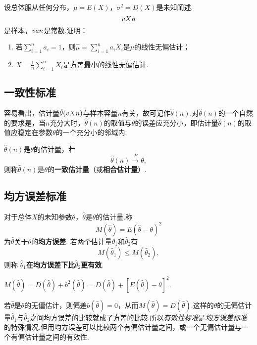 \begin{example}
设总体服从任何分布，\(\mu=E(X)\)，\(\sigma^2=D(X)\)是未知阐述.\[
v{X}{n}
\]是样本，\(v{a}{n}\)是常数.证明：
\begin{enumerate}
\item 若\(\sum\limits_{i=1}^n{a_i}=1\)，则\(\hat{\mu}=\sum\limits_{i=1}^n{a_i X_i}\)是\(\mu\)的线性无偏估计；
\item \(\overline{X} = \frac{1}{n} \sum\limits_{i=1}^n{X_i}\)是方差最小的线性无偏估计.
\end{enumerate}
\end{example}

\subsection{一致性标准}
容易看出，估计量\(\hat{\theta}(v{X}{n})\)与样本容量\(n\)有关，故可记作\(\hat{\theta}(n)\).对\(\hat{\theta}(n)\)的一个自然的要求是，当\(n\)充分大时，\(\hat{\theta}(n)\)的取值与\(\theta\)的误差应充分小，即估计量\(\hat{\theta}(n)\)的取值应稳定在参数\(\theta\)的一个充分小的邻域内.
\begin{definition}
\(\hat{\theta}(n)\)是\(\theta\)的估计量，若\[
\hat{\theta}(n) \overset{P}{\longrightarrow} \theta,
\]则称\(\hat{\theta}(n)\)是\(\theta\)的\textbf{一致估计量}（或\textbf{相合估计量}）.
\end{definition}

\subsection{均方误差标准}
\begin{definition}
对于总体\(X\)的未知参数\(\theta\)，\(\hat{\theta}\)是\(\theta\)的估计量.称\[
M(\hat{\theta}) = E(\hat{\theta} - \theta)^2
\]为\(\hat{\theta}\)关于\(\theta\)的\textbf{均方误差}.
若两个估计量\(\hat{\theta}_1\)和\(\hat{\theta}_2\)有\[
M(\hat{\theta}_1) \leqslant M(\hat{\theta}_2),
\]则称\textbf{ \(\hat{\theta}_1\)在均方误差下比\(\hat{\theta}_2\)更有效}.
\end{definition}

\begin{theorem}
\(M(\hat{\theta}) = D(\hat{\theta}) + b^2(\hat{\theta})
= D(\hat{\theta}) + [E(\hat{\theta}) - \theta]^2.\)
\end{theorem}
若\(\hat{\theta}\)是\(\theta\)的无偏估计，则偏差\(b(\hat{\theta})=0\)，从而\(M(\hat{\theta})=D(\hat{\theta})\).这样的\(\theta\)的无偏估计量\(\hat{\theta}_1\)与\(\hat{\theta}_2\)之间均方误差的比较就成了方差的比较.所以\emph{有效性标准}是\emph{均方误差标准}的特殊情况.但用均方误差可以比较两个有偏估计量之间，或一个无偏估计量与一个有偏估计量之间的有效性.


